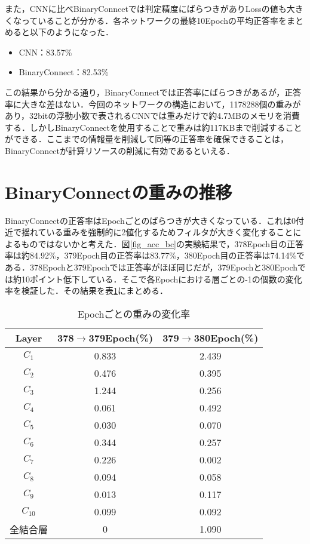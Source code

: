 また，CNNに比べBinaryConncetでは判定精度にばらつきがありLossの値も大きくなっていることが分かる．各ネットワークの最終10Epochの平均正答率をまとめると以下のようになった．
\begin{itemize}
  \item CNN：83.57\%
  \item BinaryConnect：82.53\%
\end{itemize}

この結果から分かる通り，BinaryConnectでは正答率にばらつきがあるが，正答率に大きな差はない．今回のネットワークの構造において，1178288個の重みがあり，32bitの浮動小数で表されるCNNでは重みだけで約4.7MBのメモリを消費する．しかしBinaryConnectを使用することで重みは約117KBまで削減することができる．ここまでの情報量を削減して同等の正答率を確保できることは，BinaryConnectが計算リソースの削減に有効であるといえる．

\section{BinaryConnectの重みの推移}
BinaryConnectの正答率はEpochごとのばらつきが大きくなっている．これは0付近で揺れている重みを強制的に2値化するためフィルタが大きく変化することによるものではないかと考えた．図\ref{fig_acc_bc}の実験結果で，378Epoch目の正答率は約84.92\%，379Epoch目の正答率は83.77\%，380Epoch目の正答率は74.14\%である．378Epochと379Epochでは正答率がほぼ同じだが，379Epochと380Epochでは約10ポイント低下している．そこで各Epochにおける層ごとの-1の個数の変化率を検証した．その結果を表\ref{table_parameter_transition}にまとめる．
\begin{table}[htbp]
  \caption{Epochごとの重みの変化率}
  \label{table_parameter_transition}
  \centering
  \begin{tabular}{ccc}
    \hline
    Layer & 378$\to$379Epoch(\%) & 379$\to$380Epoch(\%) \\
    \hline \hline
    $C_1$ & 0.833 & 2.439\\
    $C_2$ & 0.476 & 0.395\\
    $C_3$ & 1.244 & 0.256\\
    $C_4$ & 0.061 & 0.492\\
    $C_5$ & 0.030 & 0.070\\
    $C_6$ & 0.344 & 0.257\\
    $C_7$ & 0.226 & 0.002\\
    $C_8$ & 0.094 & 0.058\\
    $C_9$ & 0.013 & 0.117\\
    $C_{10}$ & 0.099 & 0.092\\
    全結合層 & 0 & 1.090\\
    \hline
  \end{tabular}
\end{table}

